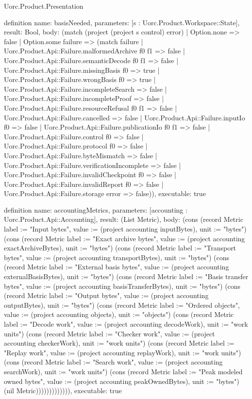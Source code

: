 \begin{lexlean}{Uorc.Product.Presentation}
\begin{semanticmodule}
definition{
  name: basisNeeded,
  parameters: [s : Uorc.Product.Workspace::State],
  result: Bool,
  body: (match (project (project s control) error)
    | Option.none => false
    | Option.some failure => (match failure
      | Uorc.Product.Api::Failure.malformedArchive f0 f1 => false
      | Uorc.Product.Api::Failure.semanticDecode f0 f1 => false
      | Uorc.Product.Api::Failure.missingBasis f0 => true
      | Uorc.Product.Api::Failure.wrongBasis f0 => true
      | Uorc.Product.Api::Failure.incompleteSearch => false
      | Uorc.Product.Api::Failure.incompleteProof => false
      | Uorc.Product.Api::Failure.resourceRefusal f0 f1 => false
      | Uorc.Product.Api::Failure.cancelled => false
      | Uorc.Product.Api::Failure.inputIo f0 => false
      | Uorc.Product.Api::Failure.publicationIo f0 f1 => false
      | Uorc.Product.Api::Failure.control f0 => false
      | Uorc.Product.Api::Failure.protocol f0 => false
      | Uorc.Product.Api::Failure.byteMismatch => false
      | Uorc.Product.Api::Failure.verificationIncomplete => false
      | Uorc.Product.Api::Failure.invalidCheckpoint f0 => false
      | Uorc.Product.Api::Failure.invalidReport f0 => false
      | Uorc.Product.Api::Failure.storage error => false)),
  executable: true
}

definition{
  name: accountingMetrics,
  parameters: [accounting : Uorc.Product.Api::Accounting],
  result: (List Metric),
  body: (cons (record Metric {label := "Input bytes", value := (project accounting inputBytes), unit := "bytes"}) (cons (record Metric {label := "Exact archive bytes", value := (project accounting exactArchiveBytes), unit := "bytes"}) (cons (record Metric {label := "Transport bytes", value := (project accounting transportBytes), unit := "bytes"}) (cons (record Metric {label := "External basis bytes", value := (project accounting externalBasisBytes), unit := "bytes"}) (cons (record Metric {label := "Basis transfer bytes", value := (project accounting basisTransferBytes), unit := "bytes"}) (cons (record Metric {label := "Output bytes", value := (project accounting outputBytes), unit := "bytes"}) (cons (record Metric {label := "Ordered objects", value := (project accounting objects), unit := "objects"}) (cons (record Metric {label := "Decode work", value := (project accounting decodeWork), unit := "work units"}) (cons (record Metric {label := "Checker work", value := (project accounting checkerWork), unit := "work units"}) (cons (record Metric {label := "Replay work", value := (project accounting replayWork), unit := "work units"}) (cons (record Metric {label := "Search work", value := (project accounting searchWork), unit := "work units"}) (cons (record Metric {label := "Peak modeled owned bytes", value := (project accounting peakOwnedBytes), unit := "bytes"}) (nil Metric))))))))))))),
  executable: true
}


\end{semanticmodule}
\end{lexlean}
